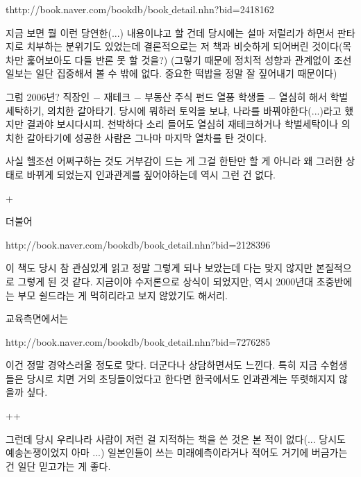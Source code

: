 thttp://book.naver.com/bookdb/book$\_$detail.nhn?bid=2418162
\vspace{5mm}

지금 보면 뭘 이런 당연한(...) 내용이냐고 할 건데 당시에는 설마 저럴리가 하면서 판타지로 치부하는 분위기도 있었는데
결론적으로는 저 책과 비슷하게 되어버린 것이다(목차만 훑어보아도 다들 반론 못 할 것을?)
(그렇기 때문에 정치적 성향과 관계없이 조선일보는 일단 집중해서 볼 수 밖에 없다. 중요한 떡밥을 정말 잘 짚어내기 때문이다)
\vspace{5mm}

그럼 2006년?
직장인 $-$ 재테크 $-$ 부동산 주식 펀드 열풍
학생들 $-$ 열심히 해서 학벌 세탁하기, 의치한 갈아타기.
당시에 뭐하러 토익을 보냐, 나라를 바꿔야한다(...)라고 했지만 결과야 보시다시피.
천박하다 소리 들어도 열심히 재테크하거나 학벌세탁이나 의치한 갈아타기에 성공한 사람은 그나마 마지막 열차를 탄 것이다.
\vspace{5mm}

사실 헬조선 어쩌구하는 것도 거부감이 드는 게
그걸 한탄만 할 게 아니라 왜 그러한 상태로 바뀌게 되었는지 인과관계를 짚어야하는데 역시 그런 건 없다.
\vspace{5mm}

+
\vspace{5mm}

더불어
\vspace{5mm}

http://book.naver.com/bookdb/book$\_$detail.nhn?bid=2128396
\vspace{5mm}

이 책도 당시 참 관심있게 읽고 정말 그렇게 되나 보았는데 다는 맞지 않지만 본질적으로 그렇게 된 것 같다.
지금이야 수저론으로 상식이 되었지만, 역시 2000년대 초중반에는 부모 쉴드라는 게 먹히리라고 보지 않았기도 해서리.
\vspace{5mm}

교육측면에서는
\vspace{5mm}

http://book.naver.com/bookdb/book$\_$detail.nhn?bid=7276285
\vspace{5mm}

이건 정말 경악스러울 정도로 맞다. 더군다나 상담하면서도 느낀다.
특히 지금 수험생들은 당시로 치면 거의 초딩들이었다고 한다면 한국에서도 인과관계는 뚜렷해지지 않을까 싶다.
\vspace{5mm}

++
\vspace{5mm}

그런데 당시 우리나라 사람이 저런 걸 지적하는 책을 쓴 것은 본 적이 없다(... 당시도 예송논쟁이었지 아마 ...)
일본인들이 쓰는 미래예측이라거나 적어도 거기에 버금가는 건 일단 믿고가는 게 좋다.
\vspace{5mm}

